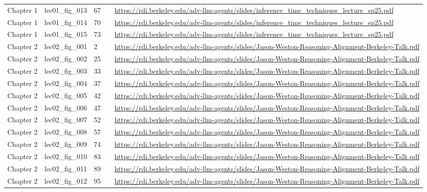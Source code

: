 \begin{longtable}{p{}p{}p{}p{}p{}}
Chapter 1 & lec01\_fig\_013 & 67 &  & \url{https://rdi.berkeley.edu/adv-llm-agents/slides/inference_time_techniques_lecture_sp25.pdf} \\
Chapter 1 & lec01\_fig\_014 & 70 &  & \url{https://rdi.berkeley.edu/adv-llm-agents/slides/inference_time_techniques_lecture_sp25.pdf} \\
Chapter 1 & lec01\_fig\_015 & 73 &  & \url{https://rdi.berkeley.edu/adv-llm-agents/slides/inference_time_techniques_lecture_sp25.pdf} \\
Chapter 2 & lec02\_fig\_001 & 2 &  & \url{https://rdi.berkeley.edu/adv-llm-agents/slides/Jason-Weston-Reasoning-Alignment-Berkeley-Talk.pdf} \\
Chapter 2 & lec02\_fig\_002 & 25 &  & \url{https://rdi.berkeley.edu/adv-llm-agents/slides/Jason-Weston-Reasoning-Alignment-Berkeley-Talk.pdf} \\
Chapter 2 & lec02\_fig\_003 & 33 &  & \url{https://rdi.berkeley.edu/adv-llm-agents/slides/Jason-Weston-Reasoning-Alignment-Berkeley-Talk.pdf} \\
Chapter 2 & lec02\_fig\_004 & 37 &  & \url{https://rdi.berkeley.edu/adv-llm-agents/slides/Jason-Weston-Reasoning-Alignment-Berkeley-Talk.pdf} \\
Chapter 2 & lec02\_fig\_005 & 42 &  & \url{https://rdi.berkeley.edu/adv-llm-agents/slides/Jason-Weston-Reasoning-Alignment-Berkeley-Talk.pdf} \\
Chapter 2 & lec02\_fig\_006 & 47 &  & \url{https://rdi.berkeley.edu/adv-llm-agents/slides/Jason-Weston-Reasoning-Alignment-Berkeley-Talk.pdf} \\
Chapter 2 & lec02\_fig\_007 & 52 &  & \url{https://rdi.berkeley.edu/adv-llm-agents/slides/Jason-Weston-Reasoning-Alignment-Berkeley-Talk.pdf} \\
Chapter 2 & lec02\_fig\_008 & 57 &  & \url{https://rdi.berkeley.edu/adv-llm-agents/slides/Jason-Weston-Reasoning-Alignment-Berkeley-Talk.pdf} \\
Chapter 2 & lec02\_fig\_009 & 74 &  & \url{https://rdi.berkeley.edu/adv-llm-agents/slides/Jason-Weston-Reasoning-Alignment-Berkeley-Talk.pdf} \\
Chapter 2 & lec02\_fig\_010 & 83 &  & \url{https://rdi.berkeley.edu/adv-llm-agents/slides/Jason-Weston-Reasoning-Alignment-Berkeley-Talk.pdf} \\
Chapter 2 & lec02\_fig\_011 & 89 &  & \url{https://rdi.berkeley.edu/adv-llm-agents/slides/Jason-Weston-Reasoning-Alignment-Berkeley-Talk.pdf} \\
Chapter 2 & lec02\_fig\_012 & 95 &  & \url{https://rdi.berkeley.edu/adv-llm-agents/slides/Jason-Weston-Reasoning-Alignment-Berkeley-Talk.pdf} \\

\end{longtable}
